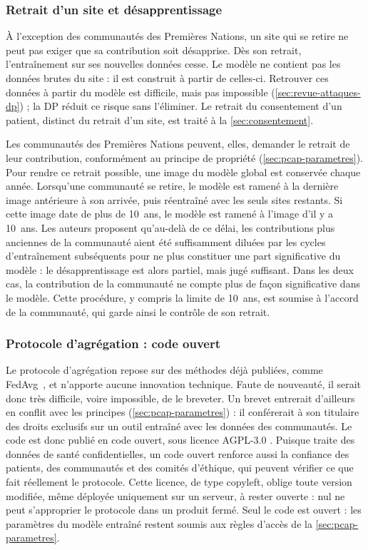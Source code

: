 \subsubsection{Retrait d'un site et désapprentissage}
\label{sec:retrait-desapprentissage}
À l'exception des communautés des Premières Nations, un site qui se retire ne peut pas exiger que sa contribution soit désapprise.
Dès son retrait, l'entraînement sur ses nouvelles données cesse.
Le modèle ne contient pas les données brutes du site : il est construit à partir de celles-ci.
Retrouver ces données à partir du modèle est difficile, mais pas impossible (\cref{sec:revue-attaques-dp}) ; la \ac{DP} réduit ce risque sans l'éliminer.
Le retrait du consentement d'un patient, distinct du retrait d'un site, est traité à la \cref{sec:consentement}.

Les communautés des Premières Nations peuvent, elles, demander le retrait de leur contribution, conformément au principe de propriété (\cref{sec:pcap-parametres}).
Pour rendre ce retrait possible, une image du modèle global est conservée chaque année.
Lorsqu'une communauté se retire, le modèle est ramené à la dernière image antérieure à son arrivée, puis réentraîné avec les seuls sites restants.
Si cette image date de plus de 10~ans, le modèle est ramené à l'image d'il y a 10~ans.
Les auteurs proposent qu'au-delà de ce délai, les contributions plus anciennes de la communauté aient été suffisamment diluées par les cycles d'entraînement subséquents pour ne plus constituer une part significative du modèle : le désapprentissage est alors partiel, mais jugé suffisant.
Dans les deux cas, la contribution de la communauté ne compte plus de façon significative dans le modèle.
Cette procédure, y compris la limite de 10~ans, est soumise à l'accord de la communauté, qui garde ainsi le contrôle de son retrait.

\subsubsection{Protocole d'agrégation : code ouvert}
\label{sec:code-ouvert}
Le protocole d'agrégation repose sur des méthodes déjà publiées, comme FedAvg~\cite{mcmahanCommunicationEfficientLearningDeep2023}, et n'apporte aucune innovation technique.
Faute de nouveauté, il serait donc très difficile, voire impossible, de le breveter.
Un brevet entrerait d'ailleurs en conflit avec les principes \pcap{} (\cref{sec:pcap-parametres}) : il conférerait à son titulaire des droits exclusifs sur un outil entraîné avec les données des communautés.
Le code est donc publié en code ouvert, sous licence AGPL-3.0 \cite{GNUAfferoGeneral}.
Puisque \fedesante{} traite des données de santé confidentielles, un code ouvert renforce aussi la confiance des patients, des communautés et des comités d'éthique, qui peuvent vérifier ce que fait réellement le protocole.
Cette licence, de type copyleft, oblige toute version modifiée, même déployée uniquement sur un serveur, à rester ouverte : nul ne peut s'approprier le protocole dans un produit fermé\cite{GNUAfferoGeneral}.
Seul le code est ouvert : les paramètres du modèle entraîné restent soumis aux règles d'accès de la \cref{sec:pcap-parametres}.


